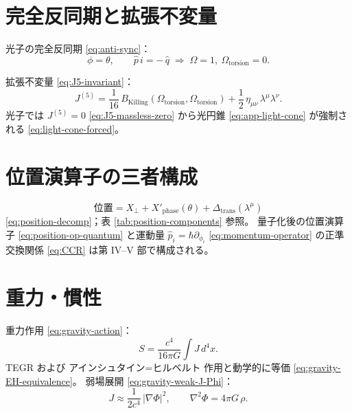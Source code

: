 \documentclass[dvipdfmx,a4paper,oneside]{jsbook}
\numberwithin{equation}{chapter}
\begin{document}
\section{完全反同期と拡張不変量}

光子の完全反同期 \eqref{eq:anti-sync}：
\begin{equation}
  \boxed{\;
  \phi = \theta,
  \qquad
  \hat{p}\, i = -\,\hat{q}
  \;\Longrightarrow\;
  \Omega = 1,\ \Omega_{\mathrm{torsion}} = 0.
  \;}
  \label{eq:app-anti-sync}
\end{equation}

拡張不変量 \eqref{eq:J5-invariant}：
\begin{equation}
  J^{(5)}
  = \frac{1}{16}\, B_{\mathrm{Killing}}(\Omega_{\mathrm{torsion}}, \Omega_{\mathrm{torsion}})
  + \frac{1}{2}\,\eta_{\mu\nu}\,\lambda^\mu \lambda^\nu.
  \label{eq:app-J5}
\end{equation}
光子では \(J^{(5)} = 0\) \eqref{eq:J5-massless-zero} から光円錐 \eqref{eq:app-light-cone} が強制される \eqref{eq:light-cone-forced}。

\section{位置演算子の三者構成}

\begin{equation}
  \boxed{\;
  \text{位置}
  = X_\perp
  + X'_{\mathrm{phase}}(\theta)
  + \Delta_{\mathrm{trans}}(\lambda^\mu)
  \;}
  \label{eq:app-position}
\end{equation}
\eqref{eq:position-decomp}；表 \ref{tab:position-components} 参照。
量子化後の位置演算子 \eqref{eq:position-op-quantum} と運動量 \(\hat{p}_i = \hbar\partial_{\phi_i}\) \eqref{eq:momentum-operator} の正準交換関係 \eqref{eq:CCR} は第 IV–V 部で構成される。

\section{重力・慣性}

重力作用 \eqref{eq:gravity-action}：
\begin{equation}
  S = \frac{c^4}{16\pi G} \int J\, d^4x.
  \label{eq:app-gravity-action}
\end{equation}
TEGR および アインシュタイン=ヒルベルト 作用と動学的に等価 \eqref{eq:gravity-EH-equivalence}。
弱場展開 \eqref{eq:gravity-weak-J-Phi}：
\begin{equation}
  J \approx \frac{1}{2c^4}\,|\nabla\Phi|^2,
  \qquad
  \nabla^2 \Phi = 4\pi G\,\rho.
  \label{eq:app-weak-gravity}
\end{equation}
\end{document}
